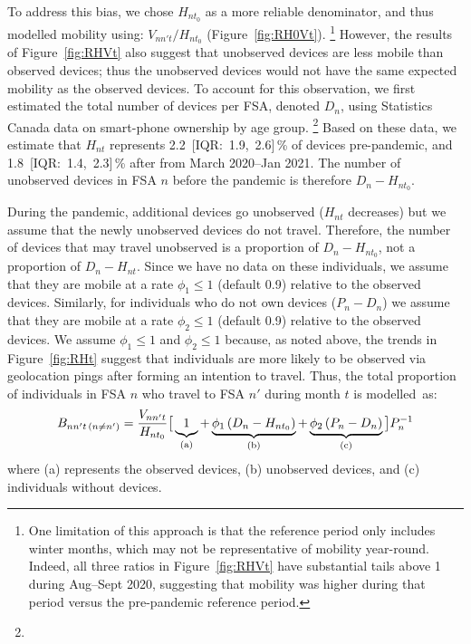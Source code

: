 To address this bias, we chose $H_{nt_0}$ as a more reliable denominator,
and thus modelled mobility using: $V_{nn't} / H_{nt_0}$ (Figure~\ref{fig:RH0Vt}).%
\footnote{One limitation of this approach is that the reference period only includes winter months,
  which may not be representative of mobility year-round.
  Indeed, all three ratios in Figure~\ref{fig:RHVt} have substantial tails above 1 during Aug--Sept 2020,
  suggesting that mobility was higher during that period versus the pre-pandemic reference period.}
However, the results of Figure~\ref{fig:RHVt} also suggest that
unobserved devices are less mobile than observed devices;
thus the unobserved devices would not have the same expected mobility as the observed devices.
To account for this observation, we first estimated the total number of devices per FSA, denoted $D_n$,
using Statistics Canada data on smart-phone ownership by age group.%
\footnote{}
Based on these data, we estimate that $H_{nt}$ represents
2.2~[IQR:~1.9,~2.6]\,\% of devices pre-pandemic, and
1.8~[IQR:~1.4,~2.3]\,\% after from March 2020--Jan 2021.
The number of unobserved devices in FSA $n$ before the pandemic is therefore $D_n - H_{nt_0}$.
\par
During the pandemic, additional devices go unobserved ($H_{nt}$ decreases)
but we assume that the newly unobserved devices do not travel.
Therefore, the number of devices that may travel unobserved
is a proportion of $D_n - H_{nt_0}$, not a proportion of $D_n - H_{nt}$.
Since we have no data on these individuals, we assume that they are mobile
at a rate $\phi_1 \le 1$ (default 0.9) relative to the observed devices.
Similarly, for individuals who do not own devices ($P_n - D_n$) we assume that they are mobile
at a rate $\phi_2 \le 1$ (default 0.9) relative to the observed devices.
We assume $\phi_1 \le 1$ and $\phi_2 \le 1$ because, as noted above,
the trends in Figure~\ref{fig:RHt} suggest that
individuals are more likely to be observed via geolocation pings after forming an intention to travel.
Thus, the total proportion of individuals in FSA $n$ who travel to FSA $n'$ during month $t$ is modelled~as:
\begin{equation}\label{eq:Bnnt.inter}
  B_{nn't \,(n\ne n')} = \frac{V_{nn't}}{H_{nt_0}} \big[
  \underbrace{1\vphantom{\phi}}_{\textrm{(a)}}
  + \underbrace{\phi_1 \left(D_n - H_{nt_0}\right)}_{\textrm{(b)}}
  + \underbrace{\phi_2 \left(P_n - D_n\right)}_{\textrm{(c)}} \big] P_n^{-1}
\end{equation}
where (a) represents the observed devices,
(b) unobserved devices, and
(c) individuals without devices.
